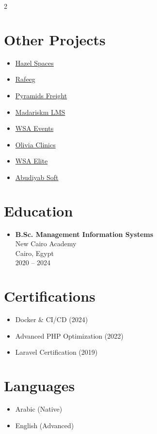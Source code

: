 \documentclass[10pt, a4paper]{article}
\begin{document}
\begin{paracol}{2}
\section{Other Projects}
\small
\begin{itemize}[leftmargin=0.15in, label={}, itemsep=3pt]
    \item \href{https://hazelspaces.com/}{Hazel Spaces}
    \item \href{https://www.rafeeg.ae/}{Rafeeg}
    \item \href{https://www.pyramidsfreight.com/}{Pyramids Freight}
    \item \href{https://www.madariskm.com/}{Madariskm LMS}
    \item \href{https://wsa-events.com/}{WSA Events}
    \item \href{https://oliviaclinics.com/}{Olivia Clinics}
    \item \href{https://wsa-elite.com/}{WSA Elite}
    \item \href{https://www.abudiyab-soft.com/}{Abudiyab Soft}
\end{itemize}

\section{Education}
\begin{itemize}[leftmargin=0.15in, label={}]
    \item \textbf{B.Sc. Management Information Systems} \\
    New Cairo Academy \\
    Cairo, Egypt \\
    2020 -- 2024
\end{itemize}

\section{Certifications}
\begin{itemize}[leftmargin=0.15in, label={}]
    \item Docker \& CI/CD (2024)
    \item Advanced PHP Optimization (2022)
    \item Laravel Certification (2019)
\end{itemize}

\section{Languages}
\begin{itemize}[leftmargin=0.15in, label={}]
    \item Arabic (Native)
    \item English (Advanced)
\end{itemize}

\end{paracol}
\end{document}
